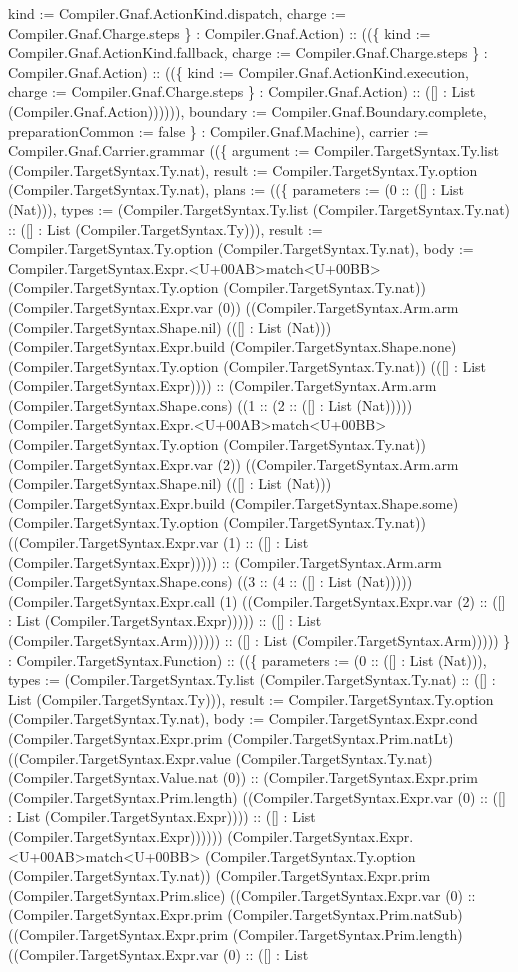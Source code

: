 \documentclass[11pt]{article}
\begin{document}
kind := Compiler.Gnaf.ActionKind.dispatch, charge := Compiler.Gnaf.Charge.steps \} : Compiler.Gnaf.Action) :: ((\{ kind := Compiler.Gnaf.ActionKind.fallback, charge := Compiler.Gnaf.Charge.steps \} : Compiler.Gnaf.Action) :: ((\{ kind := Compiler.Gnaf.ActionKind.execution, charge := Compiler.Gnaf.Charge.steps \} : Compiler.Gnaf.Action) :: ([] : List (Compiler.Gnaf.Action)))))), boundary := Compiler.Gnaf.Boundary.complete, preparationCommon := false \} : Compiler.Gnaf.Machine), carrier := Compiler.Gnaf.Carrier.grammar ((\{ argument := Compiler.TargetSyntax.Ty.list (Compiler.TargetSyntax.Ty.nat), result := Compiler.TargetSyntax.Ty.option (Compiler.TargetSyntax.Ty.nat), plans := ((\{ parameters := (0 :: ([] : List (Nat))), types := (Compiler.TargetSyntax.Ty.list (Compiler.TargetSyntax.Ty.nat) :: ([] : List (Compiler.TargetSyntax.Ty))), result := Compiler.TargetSyntax.Ty.option (Compiler.TargetSyntax.Ty.nat), body := Compiler.TargetSyntax.Expr.<U+00AB>match<U+00BB> (Compiler.TargetSyntax.Ty.option (Compiler.TargetSyntax.Ty.nat)) (Compiler.TargetSyntax.Expr.var (0)) ((Compiler.TargetSyntax.Arm.arm (Compiler.TargetSyntax.Shape.nil) (([] : List (Nat))) (Compiler.TargetSyntax.Expr.build (Compiler.TargetSyntax.Shape.none) (Compiler.TargetSyntax.Ty.option (Compiler.TargetSyntax.Ty.nat)) (([] : List (Compiler.TargetSyntax.Expr)))) :: (Compiler.TargetSyntax.Arm.arm (Compiler.TargetSyntax.Shape.cons) ((1 :: (2 :: ([] : List (Nat))))) (Compiler.TargetSyntax.Expr.<U+00AB>match<U+00BB> (Compiler.TargetSyntax.Ty.option (Compiler.TargetSyntax.Ty.nat)) (Compiler.TargetSyntax.Expr.var (2)) ((Compiler.TargetSyntax.Arm.arm (Compiler.TargetSyntax.Shape.nil) (([] : List (Nat))) (Compiler.TargetSyntax.Expr.build (Compiler.TargetSyntax.Shape.some) (Compiler.TargetSyntax.Ty.option (Compiler.TargetSyntax.Ty.nat)) ((Compiler.TargetSyntax.Expr.var (1) :: ([] : List (Compiler.TargetSyntax.Expr))))) :: (Compiler.TargetSyntax.Arm.arm (Compiler.TargetSyntax.Shape.cons) ((3 :: (4 :: ([] : List (Nat))))) (Compiler.TargetSyntax.Expr.call (1) ((Compiler.TargetSyntax.Expr.var (2) :: ([] : List (Compiler.TargetSyntax.Expr))))) :: ([] : List (Compiler.TargetSyntax.Arm)))))) :: ([] : List (Compiler.TargetSyntax.Arm))))) \} : Compiler.TargetSyntax.Function) :: ((\{ parameters := (0 :: ([] : List (Nat))), types := (Compiler.TargetSyntax.Ty.list (Compiler.TargetSyntax.Ty.nat) :: ([] : List (Compiler.TargetSyntax.Ty))), result := Compiler.TargetSyntax.Ty.option (Compiler.TargetSyntax.Ty.nat), body := Compiler.TargetSyntax.Expr.cond (Compiler.TargetSyntax.Expr.prim (Compiler.TargetSyntax.Prim.natLt) ((Compiler.TargetSyntax.Expr.value (Compiler.TargetSyntax.Ty.nat) (Compiler.TargetSyntax.Value.nat (0)) :: (Compiler.TargetSyntax.Expr.prim (Compiler.TargetSyntax.Prim.length) ((Compiler.TargetSyntax.Expr.var (0) :: ([] : List (Compiler.TargetSyntax.Expr)))) :: ([] : List (Compiler.TargetSyntax.Expr)))))) (Compiler.TargetSyntax.Expr.<U+00AB>match<U+00BB> (Compiler.TargetSyntax.Ty.option (Compiler.TargetSyntax.Ty.nat)) (Compiler.TargetSyntax.Expr.prim (Compiler.TargetSyntax.Prim.slice) ((Compiler.TargetSyntax.Expr.var (0) :: (Compiler.TargetSyntax.Expr.prim (Compiler.TargetSyntax.Prim.natSub) ((Compiler.TargetSyntax.Expr.prim (Compiler.TargetSyntax.Prim.length) ((Compiler.TargetSyntax.Expr.var (0) :: ([] : List 
\end{document}
